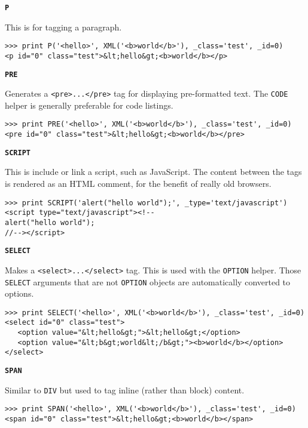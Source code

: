 \documentclass[justified,sixbynine,notoc]{tufte-book}
\def\ft{\small\tt}
\def\inxx#1{\index{#1}}
\begin{document}
\begin{fullwidth}
{\bf {\ft P}}

\inxx{P}

This is for tagging a paragraph.
\begin{lstlisting}
>>> print P('<hello>', XML('<b>world</b>'), _class='test', _id=0)
<p id="0" class="test">&lt;hello&gt;<b>world</b></p>
\end{lstlisting}

{\bf {\ft PRE}}

\inxx{PRE}

Generates a {\ft <pre>...</pre>} tag for displaying pre-formatted text. The {\ft CODE} helper is generally preferable for code listings.
\begin{lstlisting}
>>> print PRE('<hello>', XML('<b>world</b>'), _class='test', _id=0)
<pre id="0" class="test">&lt;hello&gt;<b>world</b></pre>
\end{lstlisting}

{\bf {\ft SCRIPT}}

\inxx{SCRIPT}

This is include or link a script, such as JavaScript. The content between the tags is rendered as an HTML comment, for the benefit of really old browsers.
\begin{lstlisting}
>>> print SCRIPT('alert("hello world");', _type='text/javascript')
<script type="text/javascript"><!--
alert("hello world");
//--></script>
\end{lstlisting}

{\bf {\ft SELECT}}

\inxx{SELECT}

Makes a {\ft <select>...</select>} tag. This is used with the {\ft OPTION} helper. Those {\ft SELECT} arguments that are not {\ft OPTION} objects are automatically converted to options.
\begin{lstlisting}
>>> print SELECT('<hello>', XML('<b>world</b>'), _class='test', _id=0)
<select id="0" class="test">
   <option value="&lt;hello&gt;">&lt;hello&gt;</option>
   <option value="&lt;b&gt;world&lt;/b&gt;"><b>world</b></option>
</select>
\end{lstlisting}

{\bf {\ft SPAN}}

\inxx{SPAN}

Similar to {\ft DIV} but used to tag inline (rather than block) content.
\begin{lstlisting}
>>> print SPAN('<hello>', XML('<b>world</b>'), _class='test', _id=0)
<span id="0" class="test">&lt;hello&gt;<b>world</b></span>
\end{lstlisting}


\end{fullwidth}
\end{document}
